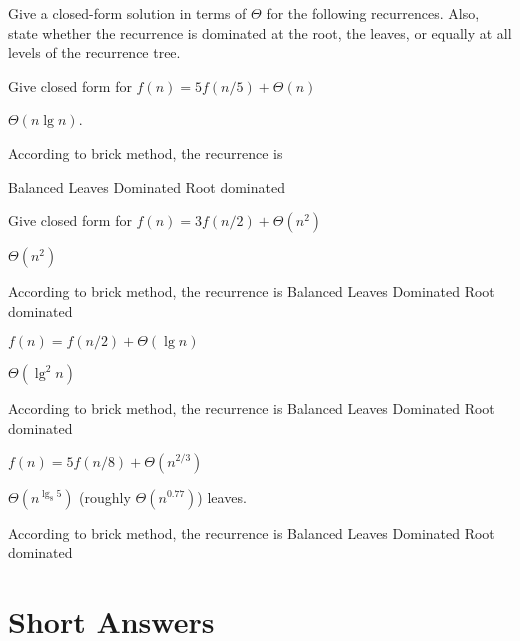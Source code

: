 \begin{problem}
Give a closed-form
solution in terms of $\Theta$ for the following recurrences.  Also, state
whether the recurrence is dominated at the root, the leaves, or
equally at all levels of the recurrence tree.

\ask[9.]
Give closed form for  
$f(n) = 5f(n/5) + \Theta(n)$

\sol[0.5]
$\Theta (n \lg n)$.

\onechoice[8.] According to brick method, the recurrence is

\choice* Balanced
\choice[0.4] Leaves Dominated
\choice[0.6] Root dominated

\ask[2.]
Give closed form for  
$f(n) = 3f(n/2) + \Theta(n^2)$

\sol
$\Theta(n^2)$

\onechoice  According to brick method, the recurrence is
\choice Balanced
\choice Leaves Dominated
\choice* Root dominated

\ask[2.]
$f(n) = f(n/2) + \Theta(\lg n)$

\sol
$\Theta (\lg^2 n)$

\onechoice  According to brick method, the recurrence is
\choice* Balanced
\choice Leaves Dominated
\choice Root dominated


\ask[2]
$f(n) = 5f(n/8) +\Theta(n^{2/3})$

\sol
$\Theta(n^{\lg_8 5})$ (roughly $\Theta(n^{0.77})$) leaves.

\onechoice  According to brick method, the recurrence is
\choice Balanced
\choice* Leaves Dominated
\choice Root dominated

\end{problem}


\section{Short Answers}

%

